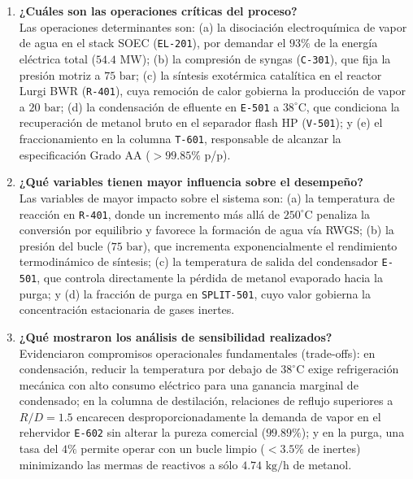 \documentclass[10pt,letterpaper]{article}
\begin{document}
\begin{enumerate}[leftmargin=*,itemsep=6pt]
    \item \textbf{¿Cuáles son las operaciones críticas del proceso?}\\
    Las operaciones determinantes son: (a) la disociación electroquímica de vapor de agua en el stack SOEC (\texttt{EL-201}), por demandar el $93\%$ de la energía eléctrica total ($54.4\text{ MW}$); (b) la compresión de syngas (\texttt{C-301}), que fija la presión motriz a $75\text{ bar}$; (c) la síntesis exotérmica catalítica en el reactor Lurgi BWR (\texttt{R-401}), cuya remoción de calor gobierna la producción de vapor a $20\text{ bar}$; (d) la condensación de efluente en \texttt{E-501} a $38^\circ\text{C}$, que condiciona la recuperación de metanol bruto en el separador flash HP (\texttt{V-501}); y (e) el fraccionamiento en la columna \texttt{T-601}, responsable de alcanzar la especificación Grado AA ($>99.85\%$ p/p).

    \item \textbf{¿Qué variables tienen mayor influencia sobre el desempeño?}\\
    Las variables de mayor impacto sobre el sistema son: (a) la temperatura de reacción en \texttt{R-401}, donde un incremento más allá de $250^\circ\text{C}$ penaliza la conversión por equilibrio y favorece la formación de agua vía RWGS; (b) la presión del bucle ($75\text{ bar}$), que incrementa exponencialmente el rendimiento termodinámico de síntesis; (c) la temperatura de salida del condensador \texttt{E-501}, que controla directamente la pérdida de metanol evaporado hacia la purga; y (d) la fracción de purga en \texttt{SPLIT-501}, cuyo valor gobierna la concentración estacionaria de gases inertes.

    \item \textbf{¿Qué mostraron los análisis de sensibilidad realizados?}\\
    Evidenciaron compromisos operacionales fundamentales (trade-offs): en condensación, reducir la temperatura por debajo de $38^\circ\text{C}$ exige refrigeración mecánica con alto consumo eléctrico para una ganancia marginal de condensado; en la columna de destilación, relaciones de reflujo superiores a $R/D = 1.5$ encarecen desproporcionadamente la demanda de vapor en el rehervidor \texttt{E-602} sin alterar la pureza comercial ($99.89\%$); y en la purga, una tasa del $4\%$ permite operar con un bucle limpio ($<3.5\%$ de inertes) minimizando las mermas de reactivos a sólo $4.74\text{ kg/h}$ de metanol.


\end{enumerate}
\end{document}
